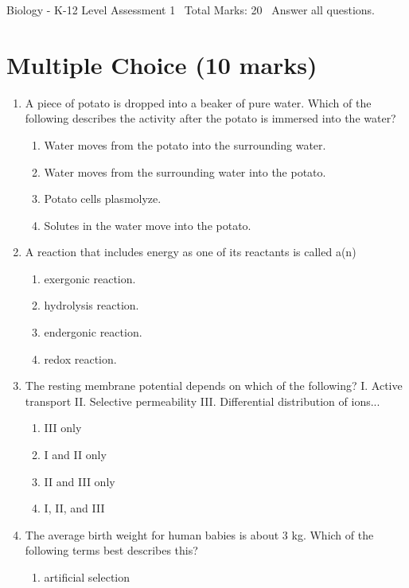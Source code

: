 \documentclass[12pt]{article}
\begin{document}
\begin{center}
Biology - K-12 Level Assessment 1 \
Total Marks: 20 \
Answer all questions.
\end{center}

\section*{Multiple Choice (10 marks)}
\begin{enumerate}[label=\arabic*.]
\item A piece of potato is dropped into a beaker of pure water. Which of the following describes the activity after the potato is immersed into the water?
\begin{enumerate}[label=(\alph*)]
    \item Water moves from the potato into the surrounding water.
    \item Water moves from the surrounding water into the potato.
    \item Potato cells plasmolyze.
    \item Solutes in the water move into the potato.
\end{enumerate}
\item A reaction that includes energy as one of its reactants is called a(n)
\begin{enumerate}[label=(\alph*)]
    \item exergonic reaction.
    \item hydrolysis reaction.
    \item endergonic reaction.
    \item redox reaction.
\end{enumerate}
\item The resting membrane potential depends on which of the following? I. Active transport II. Selective permeability III. Differential distribution of ions...
\begin{enumerate}[label=(\alph*)]
    \item III only
    \item I and II only
    \item II and III only
    \item I, II, and III
\end{enumerate}
\item The average birth weight for human babies is about 3 kg. Which of the following terms best describes this?
\begin{enumerate}[label=(\alph*)]
    \item artificial selection

\end{enumerate}
\end{enumerate}
\end{document}
